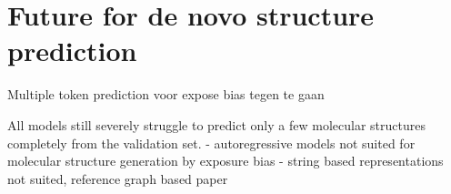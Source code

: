 \section{Future for de novo structure prediction}



Multiple token prediction voor expose bias tegen te gaan



All models still severely struggle to predict only a few molecular structures completely from the validation set.
- autoregressive models not suited for molecular structure generation by exposure bias
- string based representations not suited, reference graph based paper

